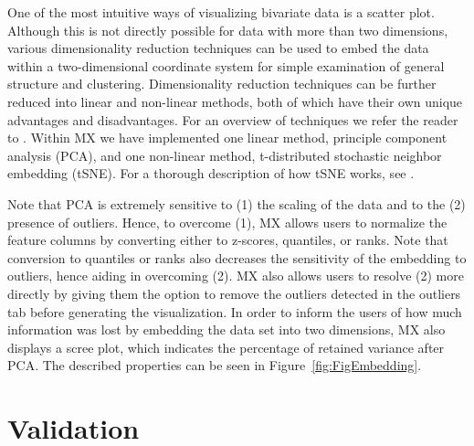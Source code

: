 \documentclass[12pt]{article}
\begin{document}
One of the most intuitive ways of visualizing bivariate data is a scatter plot. Although this is not directly possible for data with more than two dimensions, various dimensionality reduction techniques can be used to embed the data within a two-dimensional coordinate system for simple examination of general structure and clustering. Dimensionality reduction techniques can be further reduced into linear and non-linear methods, both of which have their own unique advantages and disadvantages. For an overview of techniques we refer the reader to \cite{van2009dimensionality}. Within MX we have implemented one linear method, principle component analysis (PCA), and one non-linear method, t-distributed stochastic neighbor embedding (tSNE). For a thorough description of how tSNE works, see \cite{van2008visualizing}.

Note that PCA is extremely sensitive to (1) the scaling of the data and to the (2) presence of outliers.  Hence, to overcome (1), MX allows users to normalize the feature columns by converting either to z-scores, quantiles, or ranks. Note that conversion to quantiles or ranks also decreases the sensitivity of the embedding to outliers, hence aiding in overcoming (2). MX also allows users to resolve (2) more directly by giving them the option to remove the outliers detected in the outliers tab before generating the visualization. In order to inform the users of how much information was lost by embedding the data set into two dimensions, MX also displays a scree plot, which indicates the percentage of retained variance after PCA. The described properties can be seen in Figure~\ref{fig:FigEmbedding}.

\section{Validation}
\label{sec:val}
\end{document}
